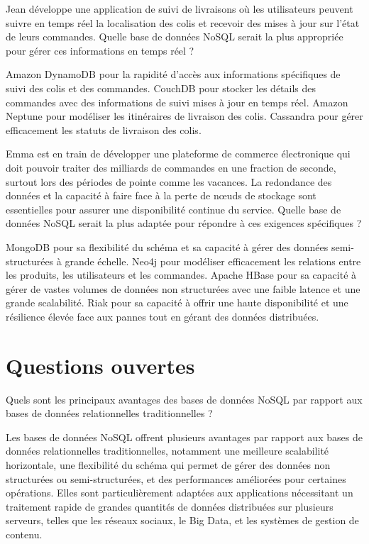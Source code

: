 \documentclass[12pt,a4paper,addpoints,answers]{exam}
\begin{document}
\begin{questions}
		\question[1] Jean développe une application de suivi de livraisons où les utilisateurs peuvent suivre en temps réel la localisation des colis et recevoir des mises à jour sur l'état de leurs commandes. Quelle base de données NoSQL serait la plus appropriée pour gérer ces informations en temps réel ?
		\begin{checkboxes}
			\CorrectChoice Amazon DynamoDB pour la rapidité d'accès aux informations spécifiques de suivi des colis et des commandes.
			\choice CouchDB pour stocker les détails des commandes avec des informations de suivi mises à jour en temps réel.
			\choice Amazon Neptune pour modéliser les itinéraires de livraison des colis.
			\choice Cassandra pour gérer efficacement les statuts de livraison des colis.
		\end{checkboxes}
		
		\question[1] Emma est en train de développer une plateforme de commerce électronique qui doit pouvoir traiter des milliards de commandes en une fraction de seconde, surtout lors des périodes de pointe comme les vacances. La redondance des données et la capacité à faire face à la perte de nœuds de stockage sont essentielles pour assurer une disponibilité continue du service. Quelle base de données NoSQL serait la plus adaptée pour répondre à ces exigences spécifiques ?
		\begin{checkboxes}
			\choice MongoDB pour sa flexibilité du schéma et sa capacité à gérer des données semi-structurées à grande échelle.
			\choice Neo4j pour modéliser efficacement les relations entre les produits, les utilisateurs et les commandes.
			\CorrectChoice Apache HBase pour sa capacité à gérer de vastes volumes de données non structurées avec une faible latence et une grande scalabilité.
			\choice Riak pour sa capacité à offrir une haute disponibilité et une résilience élevée face aux pannes tout en gérant des données distribuées.
		\end{checkboxes}
		
		\section*{Questions ouvertes}
		
		\setlength\linefillheight{.2in}
		\question[5] Quels sont les principaux avantages des bases de données NoSQL par rapport aux bases de données relationnelles traditionnelles ?
		
		\fillwithlines{15cm}
		
		\begin{solution}
			Les bases de données NoSQL offrent plusieurs avantages par rapport aux bases de données relationnelles traditionnelles, notamment une meilleure scalabilité horizontale, une flexibilité du schéma qui permet de gérer des données non structurées ou semi-structurées, et des performances améliorées pour certaines opérations. Elles sont particulièrement adaptées aux applications nécessitant un traitement rapide de grandes quantités de données distribuées sur plusieurs serveurs, telles que les réseaux sociaux, le Big Data, et les systèmes de gestion de contenu.
		\end{solution}
		

\end{questions}
\end{document}
